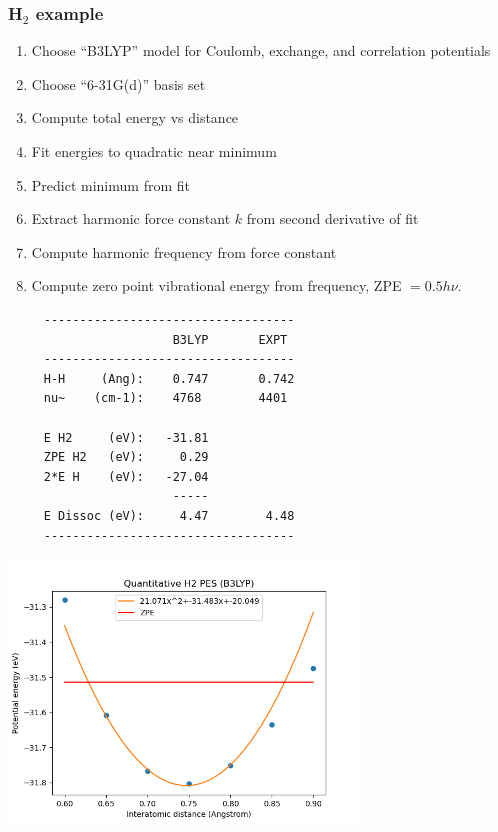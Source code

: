 \documentclass[11pt]{article}
\begin{document}
\subsubsection{H\(_2\) example}
\label{sec:org2f17e10}
\begin{enumerate}
\item Choose ``B3LYP'' model for Coulomb, exchange, and correlation potentials
\item Choose ``6-31G(d)'' basis set
\item Compute total energy vs distance
\item Fit energies to quadratic near minimum
\item Predict minimum from fit
\item Extract harmonic force constant \(k\) from second derivative of fit
\item Compute harmonic frequency from force constant
\item Compute zero point vibrational energy from frequency, ZPE \(=0.5 h\nu\).
\end{enumerate}

\label{}
\begin{verbatim}
     -----------------------------------
                       B3LYP       EXPT
     -----------------------------------
     H-H     (Ang):    0.747       0.742
     nu~    (cm-1):    4768        4401

     E H2     (eV):   -31.81                
     ZPE H2   (eV):     0.29
     2*E H    (eV):   -27.04                
                       -----                  
     E Dissoc (eV):     4.47        4.48
     -----------------------------------
\end{verbatim}

\begin{center}
\includegraphics[width=0.7\textwidth]{./Images/H2-B3LYP.png}
\end{center}
\end{document}
